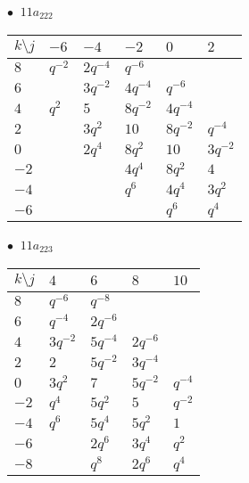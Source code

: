 \begin{minipage}{\linewidth}
$\bullet\ $ $11a_{222}$ \vspace{0.5em} \\
\begin{tabular}{l|lllll}
$k \setminus j$ & $-6$ & $-4$ & $-2$ & $0$ & $2$ \\
\hline
$8$ & $q^{-2}$ & $2q^{-4}$ & $q^{-6}$ &  &  \\
$6$ &  & $3q^{-2}$ & $4q^{-4}$ & $q^{-6}$ &  \\
$4$ & $q^{2}$ & $5$ & $8q^{-2}$ & $4q^{-4}$ &  \\
$2$ &  & $3q^{2}$ & $10$ & $8q^{-2}$ & $q^{-4}$ \\
$0$ &  & $2q^{4}$ & $8q^{2}$ & $10$ & $3q^{-2}$ \\
$-2$ &  &  & $4q^{4}$ & $8q^{2}$ & $4$ \\
$-4$ &  &  & $q^{6}$ & $4q^{4}$ & $3q^{2}$ \\
$-6$ &  &  &  & $q^{6}$ & $q^{4}$ \\
\end{tabular}
\vspace{2em}
\end{minipage}
%
\begin{minipage}{\linewidth}
$\bullet\ $ $11a_{223}$ \vspace{0.5em} \\
\begin{tabular}{l|llll}
$k \setminus j$ & $4$ & $6$ & $8$ & $10$ \\
\hline
$8$ & $q^{-6}$ & $q^{-8}$ &  &  \\
$6$ & $q^{-4}$ & $2q^{-6}$ &  &  \\
$4$ & $3q^{-2}$ & $5q^{-4}$ & $2q^{-6}$ &  \\
$2$ & $2$ & $5q^{-2}$ & $3q^{-4}$ &  \\
$0$ & $3q^{2}$ & $7$ & $5q^{-2}$ & $q^{-4}$ \\
$-2$ & $q^{4}$ & $5q^{2}$ & $5$ & $q^{-2}$ \\
$-4$ & $q^{6}$ & $5q^{4}$ & $5q^{2}$ & $1$ \\
$-6$ &  & $2q^{6}$ & $3q^{4}$ & $q^{2}$ \\
$-8$ &  & $q^{8}$ & $2q^{6}$ & $q^{4}$ \\
\end{tabular}
\vspace{2em}
\end{minipage}
%
